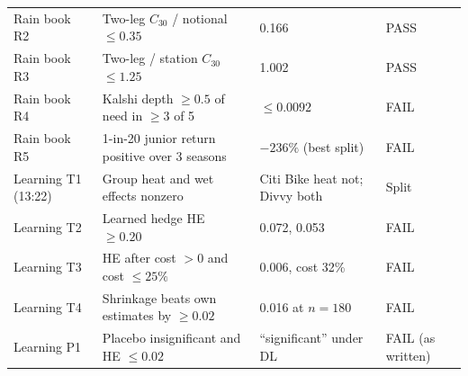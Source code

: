 \documentclass[11pt]{article}
\begin{document}
\begin{small}
\begin{longtable}{p{2.6cm}p{6.0cm}p{3.6cm}p{2.2cm}}
Rain book R2 & Two-leg $C_{30}$ / notional $\le 0.35$ & 0.166 & PASS \\
Rain book R3 & Two-leg / station $C_{30}$ $\le 1.25$ & 1.002 & PASS \\
Rain book R4 & Kalshi depth $\ge 0.5$ of need in $\ge 3$ of 5 & $\le 0.0092$ & FAIL \\
Rain book R5 & 1-in-20 junior return positive over 3 seasons & $-236\%$ (best split) & FAIL \\
Learning T1 (13:22) & Group heat and wet effects nonzero & Citi Bike heat not; Divvy both & Split \\
Learning T2 & Learned hedge HE $\ge 0.20$ & 0.072, 0.053 & FAIL \\
Learning T3 & HE after cost $> 0$ and cost $\le 25\%$ & 0.006, cost 32\% & FAIL \\
Learning T4 & Shrinkage beats own estimates by $\ge 0.02$ & 0.016 at $n = 180$ & FAIL \\
Learning P1 & Placebo insignificant and HE $\le 0.02$ & ``significant'' under DL & FAIL (as written) \\
\bottomrule
\end{longtable}
\end{small}
\end{document}
